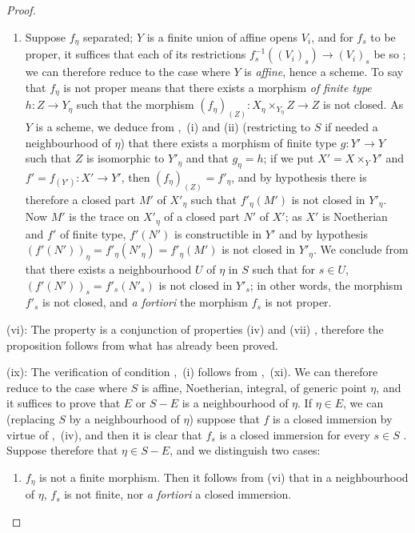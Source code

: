 \begin{proof}
\begin{enumerate}[label=\upshape{$\arabic{enumi}^\circ$}]
  \item Suppose $f_\eta$ separated; $Y$ is a finite union of affine opens $V_i$, and for $f_s$ to be proper, it suffices that each of its restrictions $f_s^{-1}((V_i)_s)\to(V_i)_s$ be so ; we can therefore reduce to the case where $Y$ is \emph{affine}, hence a scheme.
  To say that $f_\eta$ is not proper means  that there exists a morphism \emph{of finite type} $h:Z\to Y_\eta$ such that the morphism $(f_\eta)_{(Z)}:X_\eta\times_{Y_\eta} Z\to Z$ is not closed.
  As $Y$ is a scheme, we deduce from ,~(i) and (ii) (restricting to $S$ if needed a neighbourhood of $\eta$) that there exists a morphism of finite type $g:Y'\to Y$ such that $Z$ is isomorphic to $Y'_\eta$ and that $g_\eta=h$;
  if we put $X'=X\times_Y Y'$ and $f'=f_{(Y')}:X'\to Y'$, then $(f_\eta)_{(Z)}=f'_\eta$, and by hypothesis there is therefore a closed part $M'$ of $X'_\eta$ such that $f'_\eta(M')$ is not closed in $Y'_\eta$.
  Now $M'$ is the trace on $X'_\eta$ of a closed part $N'$ of $X'$; as $X'$ is Noetherian and $f'$ of finite type, $f'(N')$ is constructible in $Y'$  and by hypothesis $(f'(N'))_\eta=f'_\eta(N'_\eta)=f'_\eta(M')$ is not closed in $Y'_\eta$.
  We conclude from  that there exists a neighbourhood $U$ of $\eta$ in $S$ such that for $s\in U$, $(f'(N'))_s=f'_s(N'_s)$ is not closed in $Y'_s$; in other words, the morphism $f'_s$ is not closed, and \emph{a fortiori} the morphism $f_s$ is not proper.
\end{enumerate}

(vi): The property is a conjunction of properties (iv) and (vii) , therefore the proposition follows from what has already been proved.

(ix): The verification of condition ,~(i) follows from ,~(xi).
We can therefore reduce to the case where $S$ is affine, Noetherian, integral, of generic point $\eta$, and it suffices to prove that $E$ or $S-E$ is a neighbourhood of $\eta$.
If $\eta\in E$, we can (replacing $S$ by a neighbourhood of $\eta$) suppose that $f$ is a closed immersion by virtue of ,~(iv), and then it is clear that $f_s$ is a closed immersion for every $s\in S$ .
Suppose therefore that $\eta\in S-E$, and we distinguish two cases:
\begin{enumerate}[label=\upshape{$\arabic{enumi}^\circ$}]
  \item $f_\eta$ is not a finite morphism.
  Then it follows from (vi) that in a neighbourhood of $\eta$, $f_s$ is not finite, nor \emph{a fortiori} a closed immersion.


\end{enumerate}
\end{proof}
